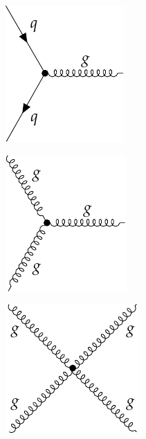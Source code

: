 \begin{figure}[!ht]
    \captionsetup[subfigure]{labelformat=empty}
    \vspace*{-0.2cm}
    \centering
    \setlength{\mylength}{\textwidth}
    \begin{subfigure}[t]{0.33\mylength}
            \centering
            \includegraphics[height=0.20\mylength]{resources/SM_vertices/v1.pdf}
            \setlength{\unitlength}{0.25\mylength}
    \end{subfigure}%
    \begin{subfigure}[t]{0.33\mylength}
            \centering
            \includegraphics[height=0.20\mylength]{resources/SM_vertices/v2.pdf}
            \setlength{\unitlength}{0.25\mylength}
    \end{subfigure}%
    \begin{subfigure}[t]{0.33\mylength}
            \centering
            \includegraphics[height=0.20\mylength]{resources/SM_vertices/v3.pdf}

\end{subfigure}
\end{figure}
